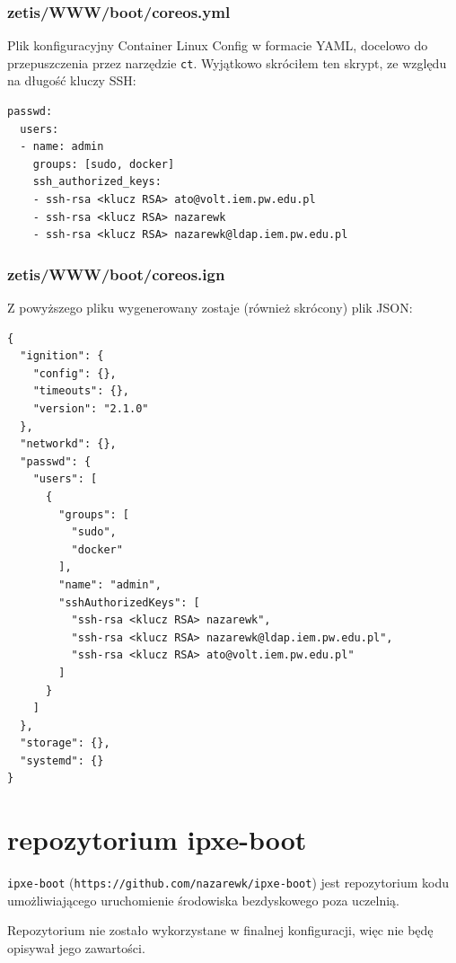 \documentclass[a4paper,12pt,twoside,openany]{report}
\newcommand{\passthrough}[1]{#1}
\begin{document}
\hypertarget{zetiswwwbootcoreos.yml}{%
\subsubsection{zetis/WWW/boot/coreos.yml}\label{zetiswwwbootcoreos.yml}}

Plik konfiguracyjny Container Linux Config w formacie YAML, docelowo do
przepuszczenia przez narzędzie \passthrough{\lstinline!ct!}. Wyjątkowo
skróciłem ten skrypt, ze względu na długość kluczy SSH:

\begin{lstlisting}
passwd:
  users:
  - name: admin
    groups: [sudo, docker]
    ssh_authorized_keys:
    - ssh-rsa <klucz RSA> ato@volt.iem.pw.edu.pl
    - ssh-rsa <klucz RSA> nazarewk
    - ssh-rsa <klucz RSA> nazarewk@ldap.iem.pw.edu.pl
\end{lstlisting}

\hypertarget{zetiswwwbootcoreos.ign}{%
\subsubsection{zetis/WWW/boot/coreos.ign}\label{zetiswwwbootcoreos.ign}}

Z powyższego pliku wygenerowany zostaje (również skrócony) plik JSON:

\begin{lstlisting}
{
  "ignition": {
    "config": {},
    "timeouts": {},
    "version": "2.1.0"
  },
  "networkd": {},
  "passwd": {
    "users": [
      {
        "groups": [
          "sudo",
          "docker"
        ],
        "name": "admin",
        "sshAuthorizedKeys": [
          "ssh-rsa <klucz RSA> nazarewk",
          "ssh-rsa <klucz RSA> nazarewk@ldap.iem.pw.edu.pl",
          "ssh-rsa <klucz RSA> ato@volt.iem.pw.edu.pl"
        ]
      }
    ]
  },
  "storage": {},
  "systemd": {}
}
\end{lstlisting}

\hypertarget{repozytorium-ipxe-boot}{%
\section{repozytorium ipxe-boot}\label{repozytorium-ipxe-boot}}

\passthrough{\lstinline!ipxe-boot!}
(\passthrough{\lstinline!https://github.com/nazarewk/ipxe-boot!}) jest
repozytorium kodu umożliwiającego uruchomienie środowiska bezdyskowego
poza uczelnią.

Repozytorium nie zostało wykorzystane w finalnej konfiguracji, więc nie
będę opisywał jego zawartości.
\end{document}
